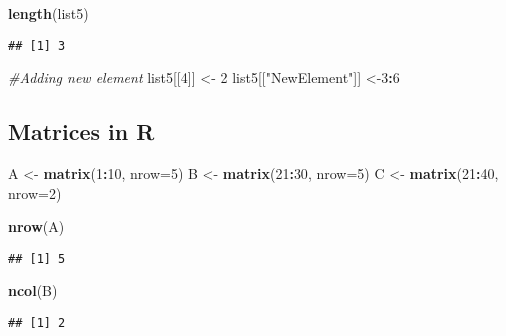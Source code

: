 \documentclass[
]{article}
\newenvironment{Shaded}{\begin{snugshade}}{\end{snugshade}}
\newcommand{\AttributeTok}[1]{\textcolor[rgb]{0.13,0.29,0.53}{#1}}
\newcommand{\CommentTok}[1]{\textcolor[rgb]{0.56,0.35,0.01}{\textit{#1}}}
\newcommand{\DecValTok}[1]{\textcolor[rgb]{0.00,0.00,0.81}{#1}}
\newcommand{\FunctionTok}[1]{\textcolor[rgb]{0.13,0.29,0.53}{\textbf{#1}}}
\newcommand{\NormalTok}[1]{#1}
\newcommand{\OtherTok}[1]{\textcolor[rgb]{0.56,0.35,0.01}{#1}}
\newcommand{\SpecialCharTok}[1]{\textcolor[rgb]{0.81,0.36,0.00}{\textbf{#1}}}
\newcommand{\StringTok}[1]{\textcolor[rgb]{0.31,0.60,0.02}{#1}}
\begin{document}
\begin{Shaded}
\begin{Highlighting}[]
\FunctionTok{length}\NormalTok{(list5)}
\end{Highlighting}
\end{Shaded}

\begin{verbatim}
## [1] 3
\end{verbatim}

\begin{Shaded}
\begin{Highlighting}[]
\CommentTok{\#Adding new element}
\NormalTok{list5[[}\DecValTok{4}\NormalTok{]] }\OtherTok{\textless{}{-}} \DecValTok{2}
\NormalTok{list5[[}\StringTok{"NewElement"}\NormalTok{]] }\OtherTok{\textless{}{-}}\DecValTok{3}\SpecialCharTok{:}\DecValTok{6}
\end{Highlighting}
\end{Shaded}

\subsection{Matrices in R}\label{matrices-in-r}

\begin{Shaded}
\begin{Highlighting}[]
\NormalTok{A }\OtherTok{\textless{}{-}} \FunctionTok{matrix}\NormalTok{(}\DecValTok{1}\SpecialCharTok{:}\DecValTok{10}\NormalTok{, }\AttributeTok{nrow=}\DecValTok{5}\NormalTok{)}
\NormalTok{B }\OtherTok{\textless{}{-}} \FunctionTok{matrix}\NormalTok{(}\DecValTok{21}\SpecialCharTok{:}\DecValTok{30}\NormalTok{, }\AttributeTok{nrow=}\DecValTok{5}\NormalTok{)}
\NormalTok{C }\OtherTok{\textless{}{-}} \FunctionTok{matrix}\NormalTok{(}\DecValTok{21}\SpecialCharTok{:}\DecValTok{40}\NormalTok{, }\AttributeTok{nrow=}\DecValTok{2}\NormalTok{)}

\FunctionTok{nrow}\NormalTok{(A)}
\end{Highlighting}
\end{Shaded}

\begin{verbatim}
## [1] 5
\end{verbatim}

\begin{Shaded}
\begin{Highlighting}[]
\FunctionTok{ncol}\NormalTok{(B)}
\end{Highlighting}
\end{Shaded}

\begin{verbatim}
## [1] 2
\end{verbatim}
\end{document}
